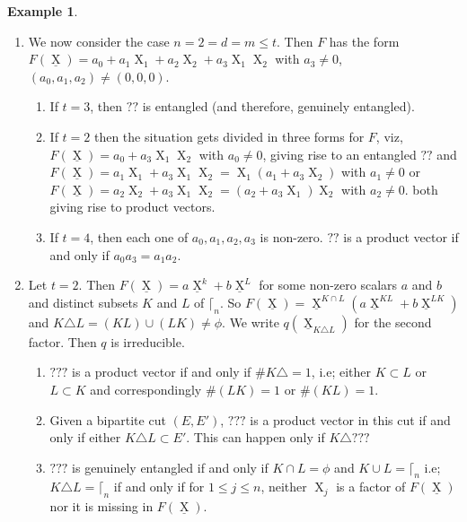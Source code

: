 \documentclass[a4paper,12pt]{article}
\DeclareMathOperator{\x}{\mathrm{X}}
\theoremstyle{definition}
\theoremstyle{underlinethm}
\newtheorem{example}{Example}[section]
\theoremstyle{underline}
\begin{document}
\begin{example}
\begin{enumerate}[label=(\roman*)]
 \item We now consider the case $n=2 =d = m \leq t$. Then $F$ has the form $F(\underline{\x}) = a_{0} + a_{1} \x_{1} + a_{2} \x_{2} + a_{3}\x_{1} \x_{2}$ with $a_{3} \neq 0$, $(a_{0}, a_{1}, a_{2}) \neq (0,0,0)$.
 
 \begin{enumerate}[label=(\alph*)]
  \item If $t=3$, then $??$ is entangled (and therefore, genuinely entangled).
 \item If $t = 2$ then the situation gets divided in three forms for $F$, viz, $F(\underline{\x}) = a_{0} + a_{3}\x_{1} \x_{2}$ with $a_{0} \neq 0$, giving rise to an entangled $??$ and $F(\underline{\x}) = a_{1}\x_{1} + a_{3}\x_{1}\x_{2} = \x_{1}(a_{1} + a_{3}\x_{2})$ with $a_{1}\neq  0$ or $F(\underline{\x}) = a_{2} \x_{2} + a_{3}\x_{1}\x_{2} = (a_{2} + a_{3}\x_{1})\x_{2}$ with $a_{2}\neq 0$. both giving rise to product vectors.
 
 \item If $t =4$, then each one of $a_{0}, a_{1}, a_{2}, a_{3}$ is non-zero. $??$ is a product vector if and only if $a_{0}a_{3}= a_{1}a_{2}$.
   \end{enumerate}
 
 \item Let $t=2$. Then $F(\underline{\x}) = a \underline{\x}^{k} + b \underline{\x}^{L}$ for some non-zero scalars $a$ and $b$ and distinct subsets $K$ and $L$ of $\lceil_{n}$. So $F(\underline{\x}) = \underline{\x}^{K \cap L} (a \underline{\x}^{K L} + b \underline{\x}^{L K})$ and $K \triangle L = (K  L) \cup  (L K) \neq \phi$. We write $q(\underline{\x}_{K \triangle L})$ for the second factor. Then $q$ is irreducible.
 
 \begin{enumerate}[label=(\alph*)]
 \item $???$ is a product vector if and only if $\# K \triangle = 1$, i.e; either $K \subset L$ or $L \subset K$ and correspondingly $\#(L K) = 1$ or $\# (K L) = 1$.
 \item Given a bipartite cut $(E,E')$, $???$ is a product vector in this cut if and only if either $K \triangle L \subset E'$. This can happen only if $K \triangle ???$
 \item $???$ is genuinely entangled if and only if $K \cap L = \phi$ and $K \cup L = \lceil_{n}$ i.e; $K \triangle L = \lceil_{n}$ if and only if for $1 \leq j \leq n$, neither $\x_{j}$ is a factor of $F(\underline{\x})$ nor it is missing in $F(\underline{\x})$. 
 \end{enumerate}
 

\end{enumerate}
\end{example}
\end{document}
